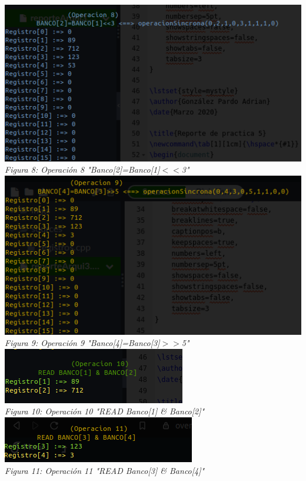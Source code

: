 \documentclass[12pt,executivepaper]{article}
\begin{document}
\begin{center}
    \includegraphics[scale=0.85]{imgs/nueve.png}\\
    \textit{Figura 8: Operación 8 "Banco[2]=Banco[1]$<<$3"}\\
    \includegraphics[scale=0.9]{imgs/diez.png}\\
    \textit{Figura 9: Operación 9 "Banco[4]=Banco[3]$>>$5"}\\
    
    \includegraphics[scale=1]{imgs/once.png}\\
    \textit{Figura 10: Operación 10 "READ Banco[1] \& Banco[2]"}\\
    \includegraphics[scale=1]{imgs/doce.png}\\
    \textit{Figura 11: Operación 11 "READ Banco[3] \& Banco[4]"}\\
    

\end{center}
\end{document}

